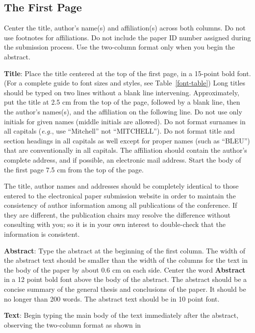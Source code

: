 \documentclass[11pt,a4paper]{article}
\begin{document}
\subsection{The First Page}
\label{ssec:first}

Center the title, author's name(s) and affiliation(s) across both
columns. Do not use footnotes for affiliations. Do not include the
paper ID number assigned during the submission process. Use the
two-column format only when you begin the abstract.

{\bf Title}: Place the title centered at the top of the first page, in
a 15-point bold font. (For a complete guide to font sizes and styles,
see Table~\ref{font-table}) Long titles should be typed on two lines
without a blank line intervening. Approximately, put the title at 2.5
cm from the top of the page, followed by a blank line, then the
author's names(s), and the affiliation on the following line. Do not
use only initials for given names (middle initials are allowed). Do
not format surnames in all capitals ({\em e.g.}, use ``Mitchell'' not
``MITCHELL'').  Do not format title and section headings in all
capitals as well except for proper names (such as ``BLEU'') that are
conventionally in all capitals.  The affiliation should contain the
author's complete address, and if possible, an electronic mail
address. Start the body of the first page 7.5 cm from the top of the
page.

The title, author names and addresses should be completely identical
to those entered to the electronical paper submission website in order
to maintain the consistency of author information among all
publications of the conference. If they are different, the publication
chairs may resolve the difference without consulting with you; so it
is in your own interest to double-check that the information is
consistent.

{\bf Abstract}: Type the abstract at the beginning of the first
column. The width of the abstract text should be smaller than the
width of the columns for the text in the body of the paper by about
0.6 cm on each side. Center the word {\bf Abstract} in a 12 point bold
font above the body of the abstract. The abstract should be a concise
summary of the general thesis and conclusions of the paper. It should
be no longer than 200 words. The abstract text should be in 10 point font.

{\bf Text}: Begin typing the main body of the text immediately after
the abstract, observing the two-column format as shown in 
\end{document}
